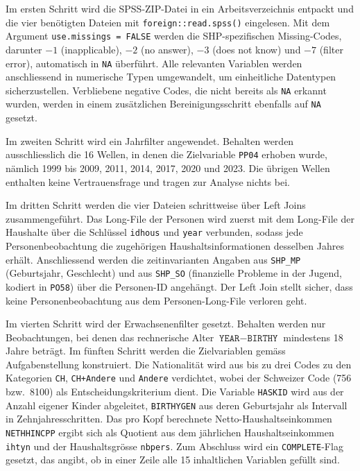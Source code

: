 Im ersten Schritt wird die SPSS-ZIP-Datei in ein Arbeitsverzeichnis entpackt und die
vier benötigten Dateien mit \texttt{foreign::read.spss()} eingelesen. Mit dem Argument
\texttt{use.missings = FALSE} werden die SHP-spezifischen Missing-Codes, darunter
\mbox{$-1$} (inapplicable), \mbox{$-2$} (no answer), \mbox{$-3$} (does not know) und
\mbox{$-7$} (filter error), automatisch in \texttt{NA} überführt. Alle relevanten
Variablen werden anschliessend in numerische Typen umgewandelt, um einheitliche
Datentypen sicherzustellen. Verbliebene negative Codes, die nicht bereits als
\texttt{NA} erkannt wurden, werden in einem zusätzlichen Bereinigungsschritt ebenfalls
auf \texttt{NA} gesetzt.

Im zweiten Schritt wird ein Jahrfilter angewendet. Behalten werden ausschliesslich die
16 Wellen, in denen die Zielvariable \texttt{PP04} erhoben wurde, nämlich 1999 bis
2009, 2011, 2014, 2017, 2020 und 2023. Die übrigen Wellen enthalten keine
Vertrauensfrage und tragen zur Analyse nichts bei.

Im dritten Schritt werden die vier Dateien schrittweise über Left Joins
zusammengeführt. Das Long-File der Personen wird zuerst mit dem Long-File der
Haushalte über die Schlüssel \texttt{idhous} und \texttt{year} verbunden, sodass jede
Personenbeobachtung die zugehörigen Haushaltsinformationen desselben Jahres erhält.
Anschliessend werden die zeitinvarianten Angaben aus \texttt{SHP\_MP} (Geburtsjahr,
Geschlecht) und aus \texttt{SHP\_SO} (finanzielle Probleme in der Jugend, kodiert in
\texttt{PO58}) über die Personen-ID angehängt. Der Left Join stellt sicher, dass keine
Personenbeobachtung aus dem Personen-Long-File verloren geht.

Im vierten Schritt wird der Erwachsenenfilter gesetzt. Behalten werden nur
Beobachtungen, bei denen das rechnerische Alter $\texttt{YEAR} - \texttt{BIRTHY}$
mindestens 18 Jahre beträgt. Im fünften Schritt werden die Zielvariablen gemäss
Aufgabenstellung konstruiert. Die Nationalität wird aus bis zu drei Codes zu den
Kategorien \texttt{CH}, \texttt{CH+Andere} und \texttt{Andere} verdichtet, wobei der
Schweizer Code (756 bzw.\ 8100) als Entscheidungskriterium dient. Die Variable
\texttt{HASKID} wird aus der Anzahl eigener Kinder abgeleitet, \texttt{BIRTHYGEN} aus
deren Geburtsjahr als Intervall in Zehnjahresschritten. Das pro Kopf berechnete
Netto-Haushaltseinkommen \texttt{NETHHINCPP} ergibt sich als Quotient aus dem
jährlichen Haushaltseinkommen \texttt{ihtyn} und der Haushaltsgrösse \texttt{nbpers}.
Zum Abschluss wird ein \texttt{COMPLETE}-Flag gesetzt, das angibt, ob in einer Zeile
alle 15 inhaltlichen Variablen gefüllt sind.

